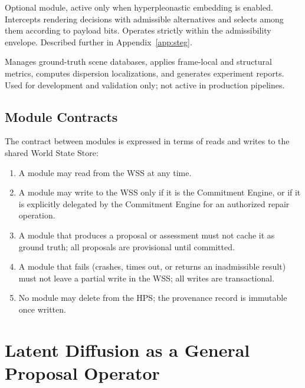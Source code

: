 \documentclass[11pt,a4paper]{article}
\theoremstyle{plain}
\theoremstyle{definition}
\theoremstyle{remark}
\begin{document}
\begin{description}[leftmargin=2em,itemsep=6pt]
\item[\textbf{Steganographic Selector Layer (SSL).}] Optional module, active only when hyperpleonastic embedding is enabled. Intercepts rendering decisions with admissible alternatives and selects among them according to payload bits. Operates strictly within the admissibility envelope. Described further in Appendix~\ref{app:steg}.

\item[\textbf{Evaluation Harness (EH).}] Manages ground-truth scene databases, applies frame-local and structural metrics, computes dispersion localizations, and generates experiment reports. Used for development and validation only; not active in production pipelines.

\end{description}

\subsection{Module Contracts}

The contract between modules is expressed in terms of reads and writes to the shared World State Store:

\begin{enumerate}[leftmargin=2em,itemsep=0pt]
\item A module may read from the WSS at any time.
\item A module may write to the WSS only if it is the Commitment Engine, or if it is explicitly delegated by the Commitment Engine for an authorized repair operation.
\item A module that produces a proposal or assessment must not cache it as ground truth; all proposals are provisional until committed.
\item A module that fails (crashes, times out, or returns an inadmissible result) must not leave a partial write in the WSS; all writes are transactional.
\item No module may delete from the HPS; the provenance record is immutable once written.
\end{enumerate}

\section{Latent Diffusion as a General Proposal Operator}
\label{sec:diffusion}
\end{document}
